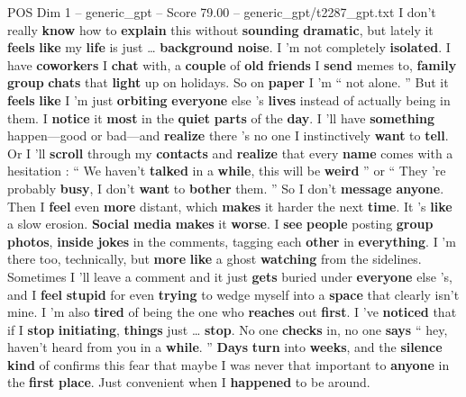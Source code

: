 \begin{textsample}{POS Dim 1 – generic\_gpt – Score 79.00 – generic\_gpt/t2287\_gpt.txt}  \label{ex:f1_pos_015}
I don't really \textbf{know} how to \textbf{explain} this without \textbf{sounding} \textbf{dramatic}, but lately it \textbf{feels} \textbf{like} my \textbf{life} is just … \textbf{background} \textbf{noise}.
I ’m not completely \textbf{isolated}.
I have \textbf{coworkers} I \textbf{chat} with, a \textbf{couple} of \textbf{old} \textbf{friends} I \textbf{send} memes to, \textbf{family} \textbf{group} \textbf{chats} that \textbf{light} up on holidays.
So on \textbf{paper} I ’m “ not alone. ” But it \textbf{feels} \textbf{like} I ’m just \textbf{orbiting} \textbf{everyone} else ’s \textbf{lives} instead of actually being in them.
I \textbf{notice} it \textbf{most} in the \textbf{quiet} \textbf{parts} of the \textbf{day}.
I ’ll have \textbf{something} happen—good or bad—and \textbf{realize} there ’s no one I instinctively \textbf{want} to \textbf{tell}.
Or I ’ll \textbf{scroll} through my \textbf{contacts} and \textbf{realize} that every \textbf{name} comes with a hesitation : “ We haven't \textbf{talked} in a \textbf{while}, this will be \textbf{weird} ” or “ They ’re probably \textbf{busy}, I don't \textbf{want} to \textbf{bother} them. ” So I don't \textbf{message} \textbf{anyone}.
Then I \textbf{feel} even \textbf{more} distant, which \textbf{makes} it harder the next \textbf{time}.
It ’s \textbf{like} a slow erosion. \textbf{Social} \textbf{media} \textbf{makes} it \textbf{worse}.
I \textbf{see} \textbf{people} posting \textbf{group} \textbf{photos}, \textbf{inside} \textbf{jokes} in the comments, tagging each \textbf{other} in \textbf{everything}.
I ’m there too, technically, but \textbf{more} \textbf{like} a ghost \textbf{watching} from the sidelines.
Sometimes I ’ll leave a comment and it just \textbf{gets} buried under \textbf{everyone} else ’s, and I \textbf{feel} \textbf{stupid} for even \textbf{trying} to wedge myself into a \textbf{space} that clearly isn't mine.
I ’m also \textbf{tired} of being the one who \textbf{reaches} out \textbf{first}.
I ’ve \textbf{noticed} that if I \textbf{stop} \textbf{initiating}, \textbf{things} just … \textbf{stop}.
No one \textbf{checks} in, no one \textbf{says} “ hey, haven't heard from you in a \textbf{while}. ” \textbf{Days} \textbf{turn} into \textbf{weeks}, and the \textbf{silence} \textbf{kind} of confirms this fear that maybe I was never that important to \textbf{anyone} in the \textbf{first} \textbf{place}.
Just convenient when I \textbf{happened} to be around.

\end{textsample}
